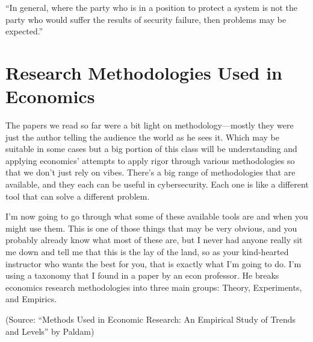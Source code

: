 \documentclass[11pt]{article}
\begin{document}
“In general, where the party who is in a position to protect a system is not the party who would suffer the results of security failure, then problems may be expected.”


\section{Research Methodologies Used in Economics}

The papers we read so far were a bit light on methodology---mostly they were just the author telling the audience the world as he sees it. Which may be suitable in some cases but a big portion of this class will be understanding and applying economics' attempts to apply rigor through various methodologies so that we don't just rely on vibes. 
There's a big range of methodologies that are available, and they each can be useful in cybersecurity. 
Each one is like a different tool that can solve a different problem.

I'm now going to go through what some of these available tools are and when you might use them.
This is one of those things that may be very obvious, and you probably already know what most of these are, but I never had anyone really sit me down and tell me that this is the lay of the land, so as your kind-hearted instructor who wants the best for you, that is exactly what I'm going to do. I'm using a taxonomy that I found in a paper by an econ professor. He breaks economics research methodologies into three main groups: Theory, Experiments, and Empirics.

(Source: ``Methods Used in Economic Research: An Empirical Study of Trends and Levels'' by Paldam)
\end{document}
